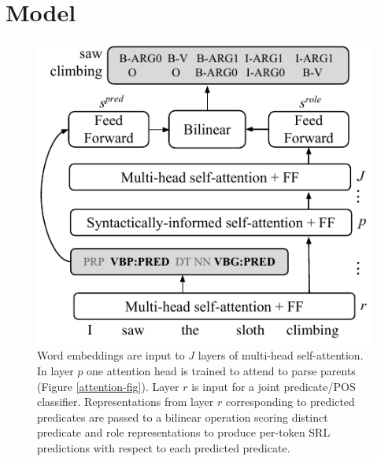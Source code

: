 \documentclass[11pt,a4paper]{article}
\begin{document}
\section{Model}

\begin{figure}[t]
\begin{center}
\includegraphics[scale=.8]{no_words_simpler_compact-srl-model.pdf}
\caption{Word embeddings are input to $J$ layers of multi-head self-attention. In layer $p$ one attention head is trained to attend to parse parents (Figure \ref{attention-fig}). Layer $r$ is input for a joint predicate/POS classifier. Representations from layer $r$ corresponding to predicted predicates are passed to  a bilinear operation scoring distinct predicate and role representations to produce per-token SRL predictions with respect to each predicted predicate.\label{architecture-fig}}
\end{center}
\end{figure}
\end{document}
